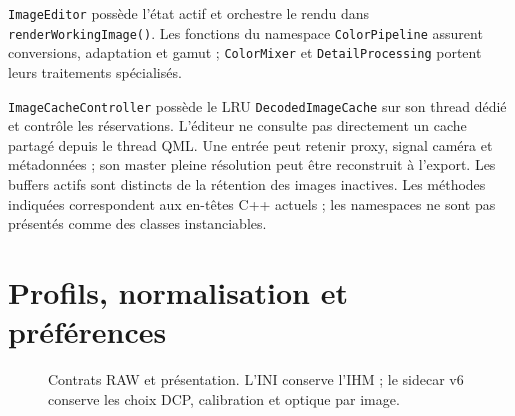 \texttt{ImageEditor} possède l'état actif et orchestre le rendu dans
\texttt{renderWorkingImage()}. Les fonctions du namespace \texttt{ColorPipeline}
assurent conversions, adaptation et gamut ; \texttt{ColorMixer} et
\texttt{DetailProcessing} portent leurs traitements spécialisés.

\texttt{ImageCacheController} possède le LRU \texttt{DecodedImageCache} sur son
thread dédié et contrôle les réservations. L'éditeur ne consulte pas directement
un cache partagé depuis le thread QML. Une entrée peut retenir proxy, signal
caméra et métadonnées ; son master pleine résolution peut être reconstruit
à l'export. Les buffers actifs sont distincts de la rétention des images inactives.
Les méthodes indiquées correspondent aux en-têtes C++ actuels ; les namespaces
ne sont pas présentés comme des classes instanciables.

\section{Profils, normalisation et préférences}

\begin{figure}[htbp]
\centering
{}
\caption{Contrats RAW et présentation. L'INI conserve l'IHM ; le sidecar v6 conserve les choix DCP, calibration et optique par image.}
\end{figure}
